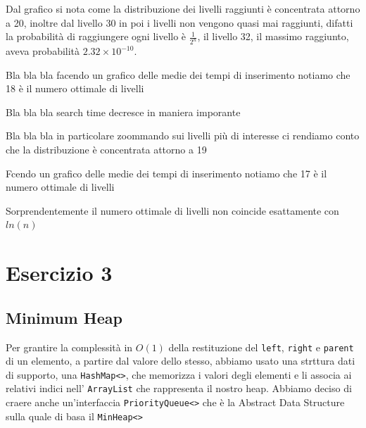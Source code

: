 \documentclass[12pt, letterpaper]{report}
\begin{document}
Dal grafico si nota come la distribuzione dei livelli raggiunti è concentrata 
attorno a 20, inoltre dal livello 30 in poi i livelli non vengono quasi mai raggiunti, 
difatti la probabilità di raggiungere ogni livello è $\frac{1}{2^n}$, il livello
32, il massimo raggiunto, aveva probabilità $2.32 \times 10^{-10}$.
\begin{figure}[H]
\centering
    
\end{figure}

Bla bla bla facendo un grafico delle medie dei tempi di inserimento notiamo che 18
è il numero ottimale di livelli
\begin{figure}[H]
\centering
    
\end{figure}

Bla bla bla search time decresce in maniera imporante
\begin{figure}[H]
\centering
    
\end{figure}

Bla bla bla in particolare zoommando sui livelli più di interesse ci rendiamo conto
che la distribuzione è concentrata attorno a 19
\begin{figure}[H]
\centering
    
\end{figure}

Fcendo un grafico delle medie dei tempi di inserimento notiamo che 17
è il numero ottimale di livelli
\begin{figure}[H]
\centering
    
\end{figure}
Sorprendentemente il numero ottimale di livelli non coincide esattamente con $ln(n)$

\chapter*{Esercizio 3}
\section{Minimum Heap}
Per grantire la complessità in $O(1)$ della restituzione del \verb|left|, \verb|right|
e \verb|parent| di un elemento, a partire dal valore dello stesso, abbiamo usato 
una strttura dati di supporto, una \verb|HashMap<>|, che memorizza i valori degli 
elementi e li associa ai relativi indici nell' \verb|ArrayList| che rappresenta il 
nostro heap.
\newline
\newline
Abbiamo deciso di craere anche un'interfaccia \verb|PriorityQueue<>| che è la Abstract
Data Structure sulla quale di basa il \verb|MinHeap<>|
\end{document}
